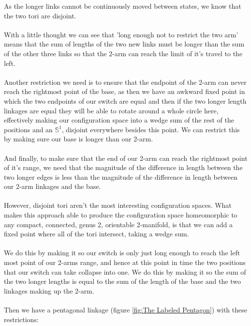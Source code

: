 \documentclass{article}
\begin{document}
\noindent As the longer links cannot be continuously moved between states, we know that the two tori are disjoint. \\\\ With a little thought we can see that 'long enough not to restrict the two arm' means that the sum of lengths of the two new links must be longer than the sum of the other three links so that the 2-arm can reach the limit of it's travel to the left. \\\\ Another restriction we need is to ensure that the endpoint of the 2-arm can never reach the rightmost point of the base, as then we have an awkward fixed point in which the two endpoints of our switch are equal and then if the two longer length linkages are equal they will be able to rotate around a whole circle here, effectively making our configuration space into a wedge sum of the rest of the positions and an $\mathbb S^1$, disjoint everywhere besides this point. We can restrict this by making sure our base is longer than our 2-arm. \\\\ And finally, to make sure that the end of our 2-arm can reach the rightmost point of it's range, we need that the magnitude of the difference in length between the two longer edges is less than the magnitude of the difference in length between our 2-arm linkages and the base. \\\\ However, disjoint tori aren't the most interesting configuration spaces. What makes this approach able to produce the configuration space homeomorphic to any compact, connected, genus 2, orientable 2-manifold, is that we can add a fixed point where all of the tori intersect, taking a wedge sum. \\\\ We do this by making it so our switch is only just long enough to reach the left most point of our 2-arms range, and hence at this point in time the two positions that our switch can take collapse into one. We do this by making it so the sum of the two longer lengths is equal to the sum of the length of the base and the two linkages making up the 2-arm. \\\\ Then we have a pentagonal linkage (figure \ref{fig:The Labeled Pentagon}) with these restrictions:
\end{document}
